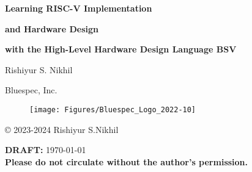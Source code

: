 
\pagestyle{empty}

\begin{center}

\vspace*{1.5in}

{\LARGE\bf Learning RISC-V Implementation}

{\LARGE\bf and Hardware Design}

{\LARGE\bf with the High-Level Hardware Design Language BSV}

\vspace{2cm}

{\Large Rishiyur S. Nikhil}

Bluespec, Inc.

\vspace*{0.5in}

\begin{figure}[htbp]
  \centerline{\texttt{[image: Figures/Bluespec\_Logo\_2022-10]}}
\end{figure}

\vfill

\copyright{} 2023-2024 Rishiyur S.Nikhil

\vspace{0.5in}

{\bf DRAFT:} \today \\
{\bf Please do not circulate without the author's permission.}

\end{center}


% 



\vspace*{2in}


% 


\newpage

\pagestyle{myheadings}


{\small

\tableofcontents

}




